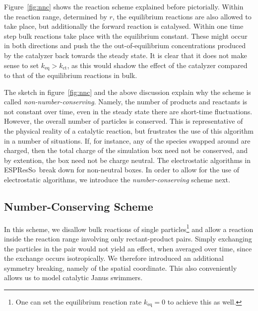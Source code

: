 \documentclass[aip,jcp,reprint,a4paper,onecolumn,nofootinbib,amsmath,amssymb]{revtex4-1}
\newcommand{\es}{\mbox{\textsf{ESPResSo}}\xspace}
\begin{document}
Figure~\ref{fig:nnc} shows the reaction scheme explained before pictorially. Within the reaction range, determined by $r$, the equilibrium reactions are also allowed to take place, but additionally the forward reaction is catalysed. Within one time step bulk reactions take place with the equilibrium constant. These might occur in both directions and push the the out-of-equilibrium concentrations produced by the catalyzer back towards the steady state. It is clear that it does not make sense to set $k_{\text{eq}} > k_{\text{ct}}$, as this would shadow the effect of the catalyzer compared to that of the equilibrium reactions in bulk.

The sketch in figure~\ref{fig:nnc} and the above discussion explain why the scheme is called \emph{non-number-conserving}. Namely, the number of products and reactants is not constant over time, even in the steady state there are short-time fluctuations. However, the overall number of particles is conserved. This is representative of the physical reality of a catalytic reaction, but frustrates the use of this algorithm in a number of situations. If, for instance, any of the species swapped around are charged, then the total charge of the simulation box need not be conserved, and by extention, the box need not be charge neutral. The electrostatic algorithms in \es\ break down for non-neutral boxes. In order to allow for the use of electrostatic algorithms, we introduce the \emph{number-conserving} scheme next.

\subsection{Number-Conserving Scheme}

In this scheme, we disallow bulk reactions of single particles\footnote{One can set the equilibrium reaction rate $k_{\text{eq}} = 0$ to achieve this as well.} and allow a reaction inside the reaction range involving only rectant-product pairs. Simply exchanging the particles in the pair would not yield an effect, when averaged over time, since the exchange occurs isotropically. We therefore introduced an additional symmetry breaking, namely of the spatial coordinate. This also conveniently allows us to model catalytic Janus swimmers.
\end{document}
